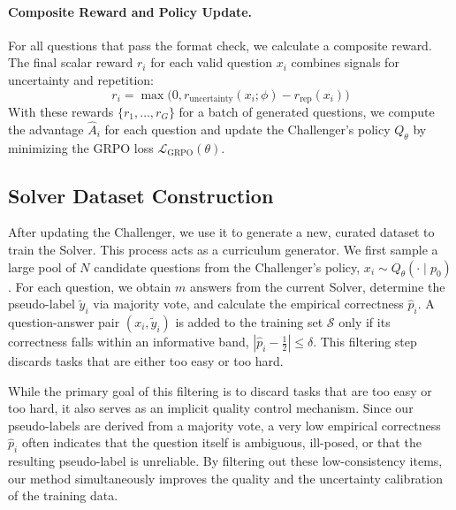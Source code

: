 \paragraph{Composite Reward and Policy Update.}
For all questions that pass the format check, we calculate a composite reward. The final scalar reward $r_i$ for each valid question $x_i$ combines signals for uncertainty and repetition:
\[
r_i = \max\bigl(0, r_{\text{uncertainty}}(x_i; \phi) - r_{\text{rep}}(x_i)\bigr)
\]
With these rewards $\{r_1, \dots, r_G\}$ for a batch of generated questions, we compute the advantage $\hat{A}_i$ for each question and update the Challenger's policy $Q_\theta$ by minimizing the GRPO loss $\mathcal{L}_{\text{GRPO}}(\theta)$.

\subsection{Solver Dataset Construction}
\label{sec:data_gen}
After updating the Challenger, we use it to generate a new, curated dataset to train the Solver. This process acts as a curriculum generator. We first sample a large pool of $N$ candidate questions from the Challenger's policy, $x_i \sim Q_{\theta}(\cdot \mid p_{0})$. For each question, we obtain $m$ answers from the current Solver, determine the pseudo-label $\tilde{y}_i$ via majority vote, and calculate the empirical correctness $\hat{p}_i$. A question-answer pair $(x_i, \tilde{y}_i)$ is added to the training set $\mathcal{S}$ only if its correctness falls within an informative band, $|\hat{p}_i-\tfrac{1}{2}|\le\delta$. This filtering step discards tasks that are either too easy or too hard.

While the primary goal of this filtering is to discard tasks that are too easy or too hard, it also serves as an implicit quality control mechanism. Since our pseudo-labels are derived from a majority vote, a very low empirical correctness $\hat{p}_i$ often indicates that the question itself is ambiguous, ill-posed, or that the resulting pseudo-label is unreliable. By filtering out these low-consistency items, our method simultaneously improves the quality and the uncertainty calibration of the training data.

